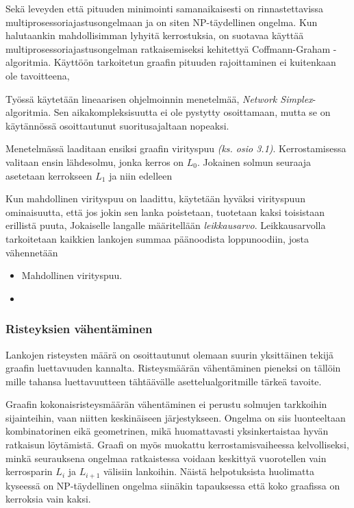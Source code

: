 \documentclass[finnish,12pt]{article}
\begin{document}
Sekä leveyden että pituuden minimointi samanaikaisesti on rinnastettavissa multiprosessoriajastusongelmaan ja on siten NP-täydellinen ongelma. \cite{RefWorks:39}
Kun halutaankin mahdollisimman lyhyitä kerrostuksia, on suotavaa käyttää multiprosessoriajastusongelman ratkaisemiseksi kehitettyä Coffmann-Graham -algoritmia. \cite{RefWorks:59}
Käyttöön tarkoitetun graafin pituuden rajoittaminen ei kuitenkaan ole tavoitteena, 

Työssä käytetään lineaarisen ohjelmoinnin menetelmää, \emph{Network Simplex}- algoritmia.
Sen aikakompleksisuutta ei ole pystytty osoittamaan, mutta se on käytännössä osoittautunut suoritusajaltaan nopeaksi.

Menetelmässä laaditaan ensiksi graafin virityspuu \emph{(ks. osio 3.1)}.
Kerrostamisessa valitaan ensin lähdesolmu, jonka kerros on $L_0$.
Jokainen solmun seuraaja asetetaan kerrokseen $L_1$ ja niin edelleen

Kun mahdollinen virityspuu on laadittu, käytetään hyväksi virityspuun ominaisuutta, että jos jokin sen lanka poistetaan, tuotetaan kaksi toisistaan erillistä puuta,
Jokaiselle langalle määritellään \emph{leikkausarvo}.
Leikkausarvolla tarkoitetaan kaikkien lankojen summaa päänoodista loppunoodiin, josta vähennetään 

\begin{itemize}
	\item Mahdollinen virityspuu.
	\item 
\end{itemize}


		\subsubsection{Risteyksien vähentäminen}


Lankojen risteysten määrä on osoittautunut olemaan suurin yksittäinen tekijä graafin luettavuuden kannalta. \cite{RefWorks:47}
Risteysmäärän vähentäminen pieneksi on tällöin mille tahansa luettavuutteen tähtäävälle asettelualgoritmille tärkeä tavoite.

Graafin kokonaisristeysmäärän vähentäminen ei perustu solmujen tarkkoihin sijainteihin, vaan niitten keskinäiseen järjestykseen.
Ongelma on siis luonteeltaan kombinatorinen eikä geometrinen, mikä huomattavasti yksinkertaistaa hyvän ratkaisun löytämistä.
Graafi on myös muokattu kerrostamisvaiheessa kelvolliseksi, minkä seurauksena ongelmaa ratkaistessa voidaan keskittyä vuorotellen vain kerrosparin $L_i$ ja $L_{i+1}$ välisiin lankoihin.
Näistä helpotuksista huolimatta kyseessä on NP-täydellinen ongelma siinäkin tapauksessa että koko graafissa on kerroksia vain kaksi. \cite{RefWorks:40}
\end{document}
